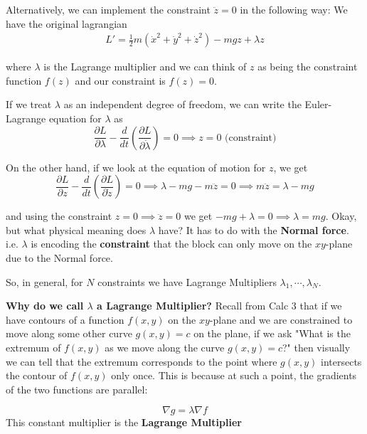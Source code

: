 \documentclass[11pt]{article}
\begin{document}
\vskip 0.5cm
Alternatively, we can implement the constraint $\ddot{z} = 0$ in the following way: We have the original lagrangian
\begin{align*}
  L' = \frac{1}{2} m \left( \dot{x}^2 + \dot{y}^2 + \dot{z}^2\right) - mgz + \lambda z
\end{align*}

where $\lambda$ is the Lagrange multiplier and we can think of $z$ as being the constraint function $f(z)$ and our constraint is $f(z) = 0$.

\vskip 0.5cm
If we treat $\lambda$ as an independent degree of freedom, we can write the Euler-Lagrange equation for $\lambda$ as 
\[ \frac{\partial L}{\partial \lambda} - \frac{d}{dt} \left(\frac{\partial L}{\partial \dot{\lambda}}\right) = 0 \implies z = 0 \text{ (constraint)} \]

On the other hand, if we look at the equation of motion for $z$, we get 
\[  \frac{\partial L}{\partial z} - \frac{d}{dt} \left(\frac{\partial L}{\partial \dot{z}}\right) = 0 \implies \lambda - mg - m\ddot{z} = 0 \implies m\ddot{z} = \lambda - mg \]

and using the constraint $z = 0 \implies \ddot{z} = 0$ we get $-mg + \lambda = 0 \implies \lambda = mg$. Okay, but what physical meaning does $\lambda$ have? It has to do with the \textbf{Normal force}. i.e. $\lambda$ is encoding the \textbf{constraint} that the block can only move on the $xy$-plane due to the Normal force. 

\begin{redbox}
  So, in general, for $N$ constraints we have Lagrange Multipliers $\lambda_1, \cdots, \lambda_N$.
\end{redbox}

\begin{bluebox}
  \textbf{Why do we call $\lambda$ a Lagrange Multiplier?}
  \vskip 0.5cm
  Recall from Calc 3 that if we have contours of a function $f(x,y)$ on the $xy$-plane and we are constrained to move along some other curve $g(x,y) = c$ on the plane, if we ask 
  \color{blue}
  "What is the extremum of $f(x,y)$ as we move along the curve $g(x,y) = c$?"
  \color{black} then visually we can tell that the extremum corresponds to the point where $g(x,y)$ intersects the contour of $f(x,y)$ only once. This is because at such a point, the gradients of the two functions are parallel:

  \[ \nabla g = \lambda \nabla f \]
  This constant multiplier is the \textbf{Lagrange Multiplier}
\end{bluebox}
\end{document}
